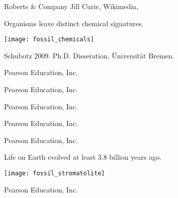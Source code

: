 \documentclass[t]{beamer}
\begin{document}
%
{
\begin{frame}[b]
\tiny \textcopyright Roberts \& Company \hfill Jill Curie, Wikimedia,  
\end{frame}
}
%
\begin{frame}[t]{Organisms leave distinct chemical signatures.}

	\texttt{[image: fossil\_chemicals]}

	\vfilll
	
	\hfill \tiny Schubotz 2009. Ph.D. Disseration, Üniversität Bremen.

\end{frame}
%
{
\begin{frame}[b]
\hfill \tiny \textcopyright Pearson Education, Inc.
\end{frame}
}
%
{
\begin{frame}[b]
\hfill \tiny \textcopyright Pearson Education, Inc.
\end{frame}
}
%
{
\begin{frame}[b]
\hfill \tiny \textcopyright Pearson Education, Inc.
\end{frame}
}
%
{
\begin{frame}[b]
\hfill \tiny \textcopyright Pearson Education, Inc.
\end{frame}
}
%
{
\begin{frame}[b]
\hfill \tiny \textcopyright Pearson Education, Inc.
\end{frame}
}
%
\begin{frame}[t]{Life on Earth evolved at least 3.8 billion years ago.}

	\texttt{[image: fossil\_stromatolite]}
	
	\vfilll
	
	\hfill \tiny \textcopyright Pearson Education, Inc.
\end{frame}
\end{document}
